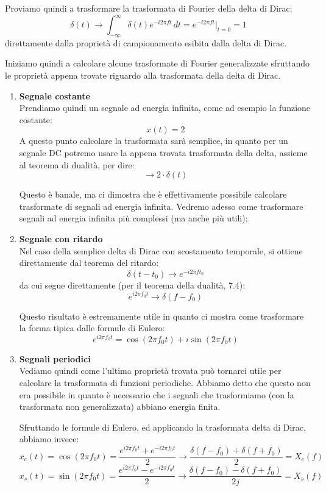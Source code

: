 \documentclass[a4paper,11pt]{article}
\begin{document}
Proviamo quindi a trasformare la trasformata di Fourier della delta di Dirac:
$$
\delta(t) \rightarrow \int_{-\infty}^{\infty} \delta(t) e^{-i 2 \pi f t} \, dt = e^{-i 2 \pi f t} \Big|_{t=0} = 1
$$
direttamente dalla proprietà di campionamento esibita dalla delta di Dirac.

\par\smallskip

Iniziamo quindi a calcolare alcune trasformate di Fourier generalizzate sfruttando le proprietà appena trovate riguardo alla trasformata della delta di Dirac.

\begin{enumerate}
	\item  \textbf{\textsf{Segnale costante}} \\
Prendiamo quindi un segnale ad energia infinita, come ad esempio la funzione costante:
$$
x(t) = 2
$$
A questo punto calcolare la trasformata sarà semplice, in quanto per un segnale DC potremo usare la appena trovata trasformata della delta, assieme al teorema di dualità, per dire:
$$
\rightarrow 2 \cdot \delta(t)
$$

Questo è banale, ma ci dimostra che è effettivamente possibile calcolare trasformate di segnali ad energia infinita. Vedremo adesso come trasformare segnali ad energia infinita più complessi (ma anche più utili);

\item  \textbf{\textsf{Segnale con ritardo}} \\
Nel caso della semplice delta di Dirac con scostamento temporale, si ottiene direttamente dal teorema del ritardo:
$$
\delta(t - t_0) \rightarrow e^{-i 2 \pi f t_0}
$$
da cui segue direttamente (per il teorema della dualità, 7.4):
$$
e^{i 2 \pi f_0 t} \rightarrow \delta(f - f_0)
$$

Questo risultato è estremamente utile in quanto ci mostra come trasformare la forma tipica dalle formule di Eulero:
$$
e^{i 2 \pi f_0 t} = \cos (2 \pi f_0 t) + i \sin (2 \pi f_0 t)
$$

\item \textbf{\textsf{Segnali periodici}} \\
Vediamo quindi come l'ultima proprietà trovata può tornarci utile per calcolare la trasformata di funzioni periodiche. Abbiamo detto che questo non era possibile in quanto è necessario che i segnali che trasformiamo (con la trasformata non generalizzata) abbiano energia finita.

Sfruttando le formule di Eulero, ed applicando la trasformata delta di Dirac, abbiamo invece:
$$
x_c(t) = \cos(2 \pi f_0 t) = \frac{e^{i 2 \pi f_0 t} + e^{-i 2 \pi f_0 t}}{2} \rightarrow
\frac{\delta(f - f_0) + \delta(f + f_0)}{2} = X_c(f)
$$
$$
x_s(t) = \sin(2 \pi f_0 t) = \frac{e^{i 2 \pi f_0 t} - e^{-i 2 \pi f_0 t}}{2} \rightarrow
\frac{\delta(f - f_0) - \delta(f + f_0)}{2j} = X_s(f)
$$


\end{enumerate}
\end{document}
